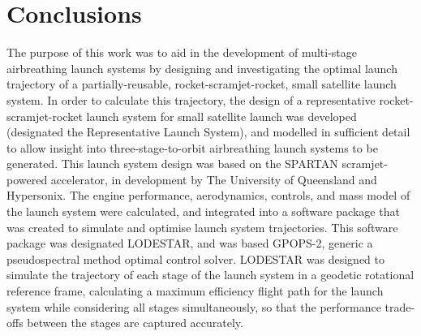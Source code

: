 \chapter{Conclusions}
\noindent
The purpose of this work was to aid in the development of multi-stage airbreathing launch systems by designing and investigating the optimal launch trajectory of a partially-reusable, rocket-scramjet-rocket, small satellite launch system. 
In order to calculate this trajectory, the design of a representative rocket-scramjet-rocket launch system for small satellite launch was developed (designated the Representative Launch System), and modelled in sufficient detail to allow insight into three-stage-to-orbit airbreathing launch systems to be generated. This launch system design was based on the SPARTAN scramjet-powered accelerator, in development by The University of Queensland and Hypersonix. The engine performance, aerodynamics, controls, and mass model of the launch system were calculated, and integrated into a software package that was created to simulate and optimise launch system trajectories. This software package was designated LODESTAR, and was based GPOPS-2, generic a pseudospectral method optimal control solver. LODESTAR was designed to simulate the trajectory of each stage of the launch system in a geodetic rotational reference frame, calculating a maximum efficiency flight path for the launch system while considering all stages simultaneously, so that the performance trade-offs between the stages are captured accurately.

